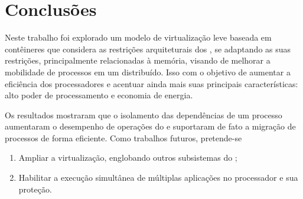 \glsresetall
\chapter{Conclusões}
\label{chap.conclusions}

Neste trabalho foi explorado um modelo de virtualização leve baseada em contêineres que considera as restrições arquiteturais dos \lws, se adaptando as suas restrições, principalmente relacionadas à memória, visando de melhorar a mobilidade de processos em um \os distribuído. Isso com o objetivo de aumentar a eficiência dos processadores \lws e acentuar ainda mais suas principais características: alto poder de processamento e economia de energia.

Os resultados mostraram que o isolamento das dependências de um processo aumentaram o desempenho de operações do  e suportaram de fato a migração de processos de forma eficiente. Como trabalhos futuros, pretende-se 
\begin{enumerate}[label=(\roman*)]
    \item Ampliar a virtualização, englobando outros subsistemas do \nanvix;
    \item Habilitar a execução simultânea de múltiplas aplicações no processador e sua proteção.
\end{enumerate}